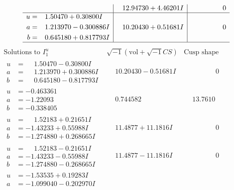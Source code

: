 \documentclass[1p]{elsarticle_modified}
\theoremstyle{definition}
\newcommand{\I}{\sqrt{-1}}
\begin{document}
$$\begin{array}{c|c|c}
 & \phantom{-}12.94730 + 4.46201 I & \phantom{-0.000000 } 0 \\ \hline\begin{aligned}
u &= \phantom{-}1.50470 + 0.30800 I \\
a &= \phantom{-}1.213970 - 0.300886 I \\
b &= \phantom{-}0.645180 + 0.817793 I\end{aligned}
 & \phantom{-}10.20430 + 0.51681 I & \phantom{-0.000000 } 0\\
 \hline 
 \end{array}$$\newpage$$\begin{array}{c|c|c}  
\text{Solutions to }I^u_{1}& \I (\text{vol} + \sqrt{-1}CS) & \text{Cusp shape}\\
 \hline 
\begin{aligned}
u &= \phantom{-}1.50470 - 0.30800 I \\
a &= \phantom{-}1.213970 + 0.300886 I \\
b &= \phantom{-}0.645180 - 0.817793 I\end{aligned}
 & \phantom{-}10.20430 - 0.51681 I & \phantom{-0.000000 } 0 \\ \hline\begin{aligned}
u &= -0.463361\phantom{ +0.000000I} \\
a &= -1.22093\phantom{ +0.000000I} \\
b &= -0.338405\phantom{ +0.000000I}\end{aligned}
 & \phantom{-}0.744582\phantom{ +0.000000I} & \phantom{-}13.7610\phantom{ +0.000000I} \\ \hline\begin{aligned}
u &= \phantom{-}1.52183 + 0.21651 I \\
a &= -1.43233 + 0.55988 I \\
b &= -1.274880 + 0.268665 I\end{aligned}
 & \phantom{-}11.4877 + 11.1816 I & \phantom{-0.000000 } 0 \\ \hline\begin{aligned}
u &= \phantom{-}1.52183 - 0.21651 I \\
a &= -1.43233 - 0.55988 I \\
b &= -1.274880 - 0.268665 I\end{aligned}
 & \phantom{-}11.4877 - 11.1816 I & \phantom{-0.000000 } 0 \\ \hline\begin{aligned}
u &= -1.53535 + 0.19283 I \\
a &= -1.099040 - 0.202970 I \\

\end{aligned}
\end{array}$$
\end{document}
